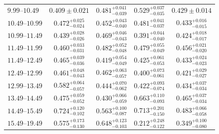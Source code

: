 \documentclass[aps,prd,reprint,superscriptaddress,floatfix,altaffilletter,nofootinbib]{revtex4-2}
\begin{document}
\begin{table}[h]
{\begin{tabular}{lc@{\qquad}c@{\qquad}c@{\qquad}c}
$9.99$--$10.49$  & $0.409{\pm}0.021$         & $0.481^{+0.041}_{-0.039}$ & $0.529^{+0.037}_{-0.035}$ &  $0.429\pm0.014$  \\
$10.49$--$10.99$ & $0.472^{+0.025}_{-0.024}$ & $0.452^{+0.043}_{-0.040}$ & $0.481^{+0.041}_{-0.037}$ &  $0.433^{+0.016}_{-0.015}$  \\
$10.99$--$11.49$ & $0.439^{+0.028}_{-0.026}$ & $0.469^{+0.046}_{-0.043}$ & $0.391^{+0.044}_{-0.040}$ &  $0.424^{+0.018}_{-0.017}$  \\
$11.49$--$11.99$ & $0.460^{+0.033}_{-0.031}$ & $0.482^{+0.052}_{-0.048}$ & $0.479^{+0.055}_{-0.049}$ &  $0.456^{+0.021}_{-0.020}$  \\
$11.49$--$12.49$ & $0.465^{+0.039}_{-0.036}$ & $0.419^{+0.054}_{-0.049}$ & $0.425^{+0.061}_{-0.053}$ &  $0.433^{+0.024}_{-0.023}$  \\
$12.49$--$12.99$ & $0.461^{+0.048}_{-0.043}$ & $0.462^{+0.063}_{-0.057}$ & $0.400^{+0.073}_{-0.061}$ &  $0.421^{+0.029}_{-0.027}$  \\
$12.99$--$13.49$ & $0.582^{+0.064}_{-0.057}$ & $0.444^{+0.070}_{-0.062}$ & $0.422^{+0.093}_{-0.074}$ &  $0.434^{+0.037}_{-0.034}$  \\
$13.49$--$14.49$ & $0.475^{+0.059}_{-0.052}$ & $0.430^{+0.066}_{-0.059}$ & $0.663^{+0.110}_{-0.093}$ &  $0.465^{+0.037}_{-0.034}$  \\
$14.49$--$15.49$ & $0.724^{+0.120}_{-0.102}$ & $0.563^{+0.100}_{-0.087}$ & $0.713^{+0.201}_{-0.150}$ &  $0.483^{+0.066}_{-0.058}$  \\
$15.49$--$19.49$ & $0.575^{+0.173}_{-0.130}$ & $0.648^{+0.123}_{-0.103}$ & $0.212^{+0.248}_{-0.122}$ &  $0.349^{+0.100}_{-0.080}$  \\
\hline\hline
\end{tabular}}
\end{table}




\clearpage


\end{document}
